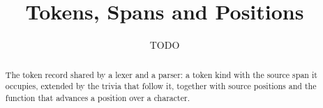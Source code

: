 \documentclass[11pt,a4paper]{article}
\begin{document}
\title{Tokens, Spans and Positions}
\author{TODO}
\maketitle

\begin{abstract}
  The token record shared by a lexer and a parser: a token kind with the source span
  it occupies, extended by the trivia that follow it, together with source positions
  and the function that advances a position over a character.
\end{abstract}

\tableofcontents


\end{document}
